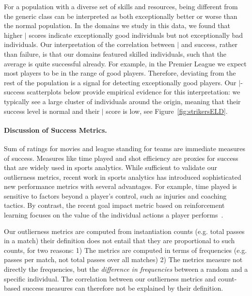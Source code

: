 {For a population with a diverse set of skills and resources,
being different from the generic class can be interpreted as both exceptionally better or worse than the normal population. In the domains we study in this data, we found that higher $\mid$ scores indicate exceptionally good individuals but not exceptionally bad individuals. Our interpretation of the correlation between $\mid$ and success, rather than failure, is that our domains featured skilled individuals, such that the average is quite successful already. 
For example, in the Premier League we expect most players to be in the range of good players. Therefore, deviating from the rest of the population is a signal for detecting exceptionally good players. Our $\mid$-success scatterplots below provide empirical evidence for this interpretation: we typically see a large cluster of individuals around the origin, meaning that their success level is normal and their $\mid$ score is low, see Figure~\ref{fig:strikersELD}. %

\paragraph{Discussion of Success Metrics.}
Sum of ratings for movies and league standing for teams are immediate measures of success. Measures like time played and shot efficiency are proxies for success that are widely used in sports analytics. While sufficient to validate our outlierness metrics, recent work in sports analytics has introduced sophisticated new performance metrics with several advantages. For example, time played is sensitive to factors beyond a player's control, such as injuries and coaching tactics.  By contrast, the recent goal impact metric based on reinforcement learning focuses on the value of the individual actions a player performs~\citep{Routley2015a,Liu2018}.

Our outlierness metrics are computed from instantiation counts (e.g. total passes in a match) their definition does not entail that they are proportional to such counts, for two reasons: 
1) The metrics are computed in terms of frequencies (e.g. passes per match, not total passes over all matches) 2) The metrics measure not directly the frequencies, but the {\em difference in frequencies} between a random and a specific individual.  The correlation between our outlierness metrics and count-based success measures can therefore not be explained by their definition.




}
